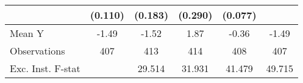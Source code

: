 {\begin{tabular}{l*{5}{c}}
            &     (0.110)         &     (0.183)         &     (0.290)         &     (0.077)         &                     \\
\midrule
Mean Y      &       -1.49         &       -1.52         &        1.87         &       -0.36         &       -1.49         \\
Observations&         407         &         413         &         414         &         408         &         407         \\
Exc. Inst. F-stat&                     &      29.514         &      31.931         &      41.479         &      49.715         \\
\bottomrule
\end{tabular}
}
